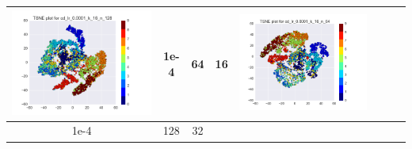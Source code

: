 \documentclass[12pt]{report}
\begin{document}
\begin{table}[H]
\begin{tabular}{ | c | c | c | c || c | c | c| c |}
\begin{minipage}{.3\textwidth}
      \includegraphics[scale=0.25]{cd_lr_0_0001_k_16_n_128.png}
    \end{minipage}
	&
    1e-4 & 64 & 16 &
    \begin{minipage}{.3\textwidth}
      \includegraphics[scale=0.25]{cd_lr_0_0001_k_16_n_64.png}
    \end{minipage}
    \\ \hline
        1e-4 & 128 & 32 &
    \begin{minipage}{.3\textwidth}

\end{minipage}
\end{tabular}
\end{table}
\end{document}
